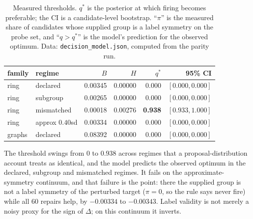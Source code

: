 \documentclass[11pt]{article}
\begin{document}
\begin{table}[t]
\caption{Measured thresholds. $q^*$ is the posterior at which firing becomes preferable; the CI is
a candidate-level bootstrap. ``$\pi$'' is the measured share of candidates whose supplied group is
a label symmetry on the probe set, and ``$q>q^*$'' is the model's prediction for the observed
optimum. Data: \texttt{decision\_model.json}, computed from the parity run.}
\label{tab:qstar}
\small
\begin{tabular}{@{}llrrrr@{}}
\toprule
family & regime & $B$ & $H$ & $q^*$ & 95\% CI \\
\midrule
ring & declared & 0.00345 & 0.00000 & 0.000 & $[0.000, 0.000]$ \\
ring & subgroup & 0.00265 & 0.00000 & 0.000 & $[0.000, 0.000]$ \\
ring & mismatched & 0.00018 & 0.00276 & \textbf{0.938} & $[0.933, 1.000]$ \\
ring & approx $0.40$sd & 0.00334 & 0.00000 & 0.000 & $[0.000, 0.000]$ \\
graphs & declared & 0.08392 & 0.00000 & 0.000 & $[0.000, 0.000]$ \\
\bottomrule
\end{tabular}
\end{table}

The threshold swings from $0$ to $0.938$ across regimes that a proposal-distribution account treats
as identical, and the model predicts the observed optimum in the declared, subgroup and mismatched
regimes. It fails on the approximate-symmetry continuum, and that failure is the point: there the
supplied group is not a label symmetry of the perturbed target ($\pi = 0$, so the rule says never
fire) while all $60$ repairs help, by $-0.00334$ to $-0.00343$. Label validity is not merely a noisy
proxy for the sign of $\Delta$; on this continuum it inverts.
\end{document}

